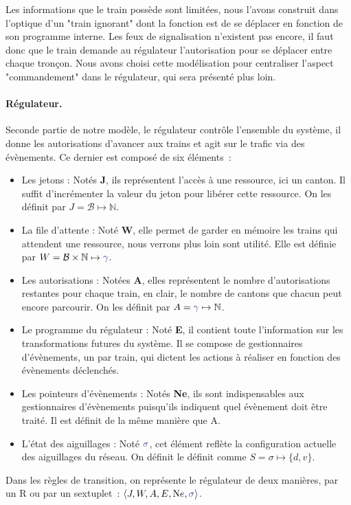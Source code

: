 \documentclass[oneside, a4paper, 11pt]{book}
\newcommand{\nats}{\ensuremath{\mathbb{N}}}
\newcommand{\trainFmt}[1]{{\color{traincolor} #1}}
\newcommand{\swFmt}[1]{{\color{swcolor}{#1}}}
\begin{document}

\noindent
Les informations que le train possède sont limitées, nous l'avons construit dans l'optique d'un "train ignorant" dont la fonction est de se déplacer en fonction de son programme interne.
Les feux de signalisation n'existent pas encore, il faut donc que le train demande au régulateur l'autorisation pour se déplacer entre chaque tronçon.
Nous avons choisi cette modélisation pour centraliser l'aspect "commandement" dans le régulateur, qui sera présenté plus loin.

\paragraph{Régulateur.} %
Seconde partie de notre modèle, le régulateur contrôle l'ensemble du système, il donne les autorisations d'avancer aux trains et agit sur le trafic via des évènements.
Ce dernier est composé de six éléments~:

\begin{itemize}
	\item Les jetons : Notés \textbf{J}, ils représentent l'accès à une ressource, ici un canton. Il suffit d'incrémenter la valeur du jeton pour libérer cette ressource.
	 On les définit par $J = \mathcal{B} \mapsto \nats$.
	\item La file d'attente : Noté \textbf{W}, elle permet de garder en mémoire les trains qui attendent une ressource, nous verrons plus loin sont utilité. Elle est définie par $W = \mathcal{B} \times \nats \mapsto \trainFmt{\gamma}$.
	\item Les autorisations : Notées \textbf{A}, elles représentent le nombre d'autorisations restantes pour chaque train, en clair, le nombre de cantons que chacun peut encore parcourir.
	 On les définit par $A = \trainFmt{\gamma} \mapsto \nats$.
	\item Le programme du régulateur : Noté \textbf{E}, il contient toute l'information sur les transformations futures du système. 
	 Il se compose de gestionnaires d'évènements, un par train, qui dictent les actions à réaliser en fonction des évènements déclenchés.
	\item Les pointeurs d'évènements : Notés \textbf{Ne}, ils sont indispensables aux gestionnaires d'évènements puisqu'ils indiquent quel évènement doit être traité. Il est définit de la même manière que A.
	\item L'état des aiguillages : Noté \textbf{$\swFmt{\sigma}$}, cet élément reflète la configuration actuelle des aiguillages du réseau. On définit le définit comme $S = \sigma \mapsto \{d, v\}$.
\end{itemize}
Dans les règles de transition, on représente le régulateur de deux manières, par un R ou par un sextuplet~: $\langle J,W,A,E,{\text Ne},\swFmt{\sigma} \rangle$.
\end{document}

